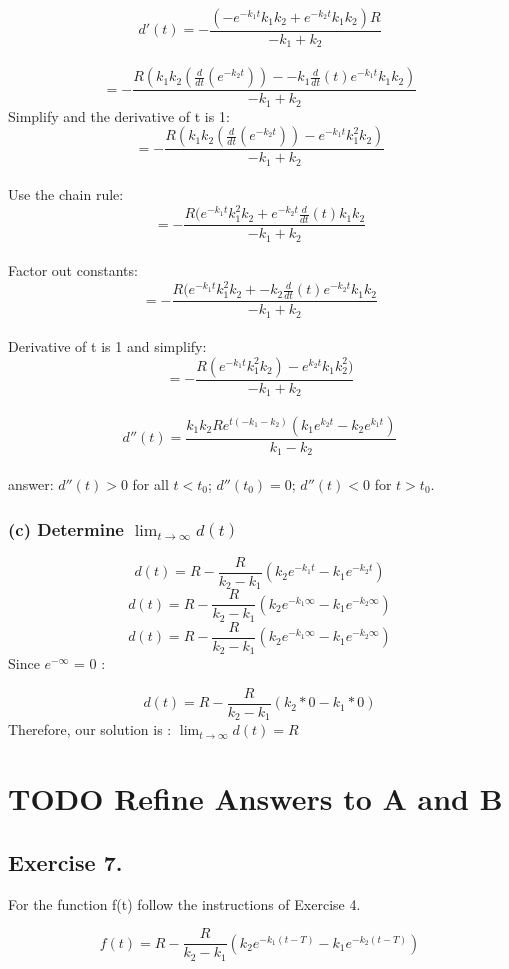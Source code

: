 \documentclass[]{article}
\begin{document}
\[d'(t) = -\frac{(-e^{-k_1 t}k_1 k_2 + e^{-k_2 t}k_1 k_2)R}{-k_1 + k_2}\]\\
\[= -\frac{R(k_1 k_2 (\frac{d}{dt}(e^{-k_2 t})) - -k_1 \frac{d}{dt}(t)e^{-k_1 t}k_1 k_2 )}{-k_1 + k_2}\]
Simplify and the derivative of t is 1:
\[= -\frac{R(k_1 k_2 (\frac{d}{dt}(e^{-k_2 t})) - e^{-k_1 t}k_1^2 k_2 )}{-k_1 + k_2}\]\\
Use the chain rule:
\[= -\frac{R(e^{-k_1 t}k_1^2 k_2 + e^{-k_2 t} \frac{d}{dt}(t)k_1 k_2 }{-k_1 + k_2}\]\\
Factor out constants:
\[= -\frac{R(e^{-k_1 t}k_1^2 k_2 + - k_2 \frac{d}{dt}(t) e^{-k_2 t}k_1 k_2} {-k_1 + k_2}\]\\
Derivative of t is 1 and simplify:
\[= - \frac{R (e^{-k_1 t}k_1^2 k_2) - e^{k_2 t} k_1 k_2^2)}{-k_1 + k_2}\]\\
\[d''(t) = \frac{k_1 k_2 R e^{t(-k_1-k_2)}(k_1 e^{k_2 t}-k_2 e^{k_1 t})}{k_1 - k_2}\]\\
answer: \(d''(t) > 0\) for all \(t < t_0\); \(d''(t_0) =0\);
\(d''(t) < 0\) for \(t > t_0\).

\subsubsection{\texorpdfstring{(c) Determine
\(\lim_{t\to\infty}d(t)\)}{(c) Determine \textbackslash{}lim\_\{t\textbackslash{}to\textbackslash{}infty\}d(t)}}\label{c-determine-lim_ttoinftydt}

\[d(t) = R - \frac{R}{k_2 - k_1}(k_2 e ^{-k_1 t} - k_1 e^{-k_2 t})\]
\[d(t) = R - \frac{R}{k_2 - k_1}(k_2 e ^{-k_1 \infty} - k_1 e^{-k_2 \infty})\]
\[d(t) = R - \frac{R}{k_2 - k_1}(k_2 e ^{-k_1 \infty} - k_1 e^{-k_2 \infty})\]
Since \(e^{-\infty}\) = 0 :

\[d(t) = R - \frac{R}{k_2 - k_1}(k_2*0 - k_1*0)\] Therefore, our
solution is : \(\lim_{t\to\infty}d(t) =R\)

\section{TODO Refine Answers to A and
B}\label{todo-refine-answers-to-a-and-b}

\subsection{Exercise 7.}\label{exercise-7.}

For the function f(t) follow the instructions of Exercise 4.

\[f(t) = R - \frac{R}{k_2 - k_1}(k_2 e^{-k_1(t-T)}-k_1 e^{-k_2(t-T)})\]
\end{document}
